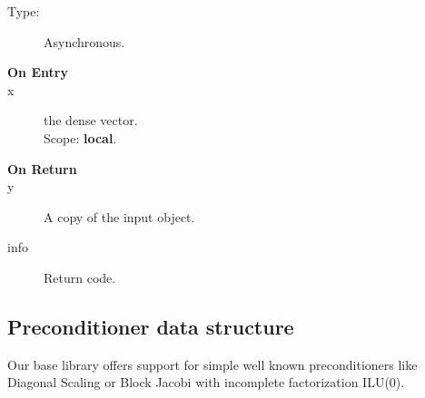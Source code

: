 \begin{description}
\item[Type:] Asynchronous.
\item[\bf On Entry]
\item[x] the dense vector.\\
Scope: {\bf local}.\\
\end{description}

\begin{description}
\item[\bf On Return]
\item[y] A copy of the input object.
\item[info] Return code. 
\end{description}


\subsection{Preconditioner data structure}
\label{sec:prec}
Our base library  offers support for  simple well known preconditioners
like Diagonal Scaling or Block Jacobi with incomplete
factorization ILU(0). 

